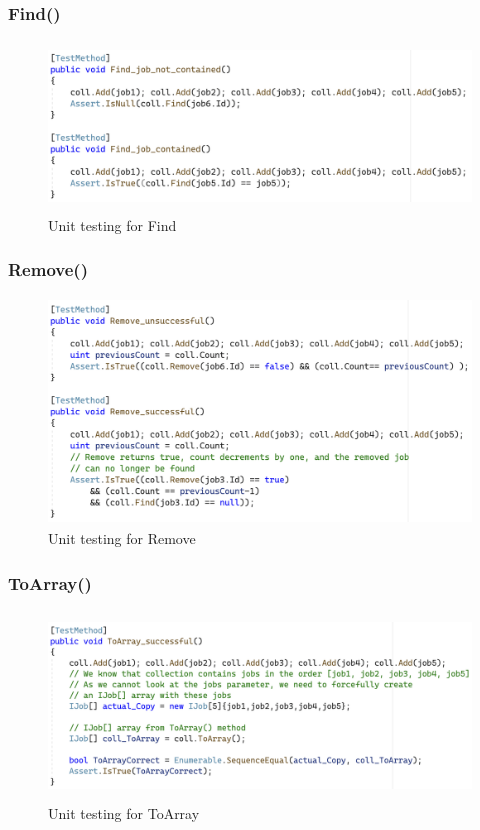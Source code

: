 \documentclass[a4paper]{article}
\begin{document}
\subsubsection{Find{()}}
\begin{figure}[H]
   \includegraphics[height=4.5cm]{images/Find.png}
   \caption{Unit testing for Find}
\end{figure}

\subsubsection{Remove{()}}
\begin{figure}[H]
   \includegraphics[height=6cm]{images/Remove.png}
   \caption{Unit testing for Remove}
\end{figure}

\subsubsection{ToArray{()}}
\begin{figure}[H]
   \includegraphics[height=5cm]{images/ToArray.png}
   \caption{Unit testing for ToArray}
\end{figure}
\end{document}
